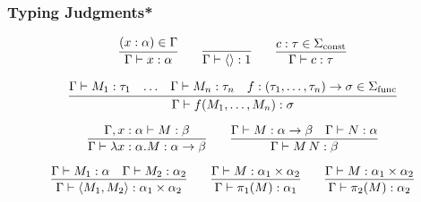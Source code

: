 \documentclass[aspectratio=169]{beamer}
\begin{document}
\begin{frame}
\frametitle{Typing Judgments*}

\[
\infer{\Gamma \vdash x : \alpha}{(x : \alpha) \in \Gamma}
\qquad
\infer{\Gamma \vdash \langle \rangle : 1}{}
\qquad
\infer{\Gamma \vdash c : \tau}{c : \tau \in \Sigma_{\text{const}}}
\]

\[
\infer{\Gamma \vdash f(M_1, \ldots, M_n) : \sigma}{\Gamma \vdash M_1 : \tau_1 & \ldots & \Gamma \vdash M_n : \tau_n & f : (\tau_1, \ldots, \tau_n) \rightarrow \sigma \in \Sigma_{\text{func}}}
\]

\[
\infer{\Gamma \vdash \lambda x : \alpha. M : \alpha \rightarrow \beta}{\Gamma, x : \alpha \vdash M : \beta}
\qquad
\infer{\Gamma \vdash M \, N : \beta}{\Gamma \vdash M : \alpha \rightarrow \beta & \Gamma \vdash N : \alpha}
\]

\[
\infer{\Gamma \vdash \langle M_1, M_2 \rangle : \alpha_1 \times \alpha_2}{\Gamma \vdash M_1 : \alpha & \Gamma \vdash M_2 : \alpha_2}
\qquad
\infer{\Gamma \vdash \pi_1(M) : \alpha_1}{\Gamma \vdash M : \alpha_1 \times \alpha_2}
\qquad
\infer{\Gamma \vdash \pi_2(M) : \alpha_2}{\Gamma \vdash M : \alpha_1 \times \alpha_2}
\]
\end{frame}
\end{document}
